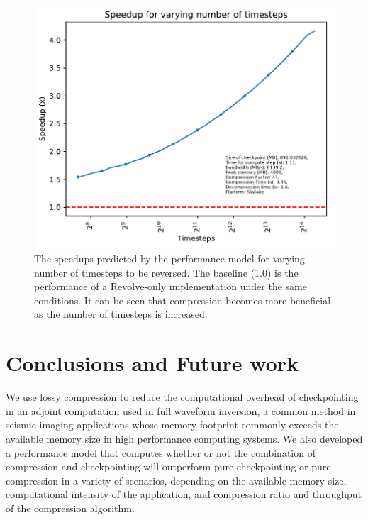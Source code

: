 \documentclass[conference]{IEEEtran}
\begin{document}
\begin{figure}
\begin{center}
\includegraphics[width=\linewidth]{images/varying-nt.pdf}
\end{center}
\caption{The speedups predicted by the performance model for varying
  number of timesteps to be reversed. The baseline
(1.0) is the performance of a Revolve-only implementation under the
same conditions. It can be seen that compression becomes more
beneficial as the number of timesteps is increased.}
\label{fig:varying_nt}
\end{figure}

\section{Conclusions and Future work}
We use lossy compression to reduce the computational overhead of checkpointing
in an adjoint computation used in full waveform inversion, a common method in
seismic imaging applications whose memory footprint commonly exceeds the
available memory size in high performance computing systems. We also developed a
performance model that computes whether or not the combination of compression
and checkpointing will outperform pure checkpointing or pure compression in a
variety of scenarios, depending on the available memory size, computational
intensity of the application, and compression ratio and throughput of the
compression algorithm.
\end{document}
